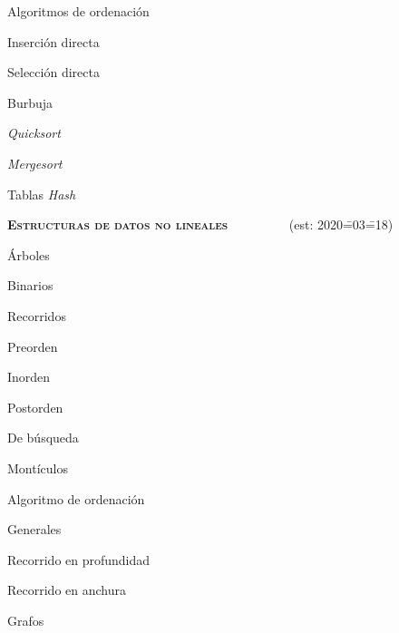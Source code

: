\begin{longenum}
\begin{longenum}
\begin{longenum}
        \end{longenum}
        \item Algoritmos de ordenación
        \begin{longenum}
            \item Inserción directa
            \item Selección directa
            \item Burbuja
            \item \textit{Quicksort}
            \item \textit{Mergesort}
        \end{longenum}
        \item Tablas \textit{Hash}
    \end{longenum}
    \item \textbf{\textsc{Estructuras de datos no lineales}} \ \ \ \ \ \ \ \ \ (est: 2020\==03\==18)
    \begin{longenum}
        \item Árboles
        \begin{longenum}
            \item Binarios
            \begin{longenum}
                \item Recorridos
                \begin{longenum}
                    \item Preorden
                    \item Inorden
                    \item Postorden
                \end{longenum}
            \end{longenum}
            \item De búsqueda
            \item Montículos
            \begin{longenum}
                \item Algoritmo de ordenación
            \end{longenum}
            \item Generales
            \begin{longenum}
                \item Recorrido en profundidad
                \item Recorrido en anchura
            \end{longenum}
        \end{longenum}
        \item Grafos

\end{longenum}
\end{longenum}
